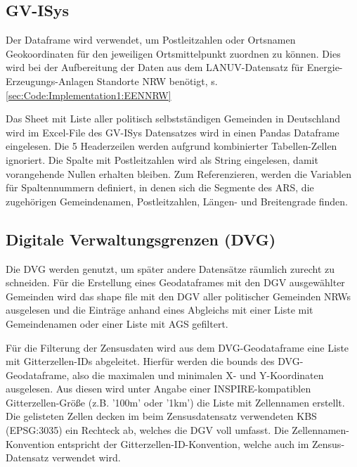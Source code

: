 		\subsection{GV-ISys}
		Der Dataframe wird verwendet, um Postleitzahlen oder Ortsnamen Geokoordinaten für den jeweiligen Ortsmittelpunkt zuordnen zu können. Dies wird bei der Aufbereitung der Daten aus dem LANUV-Datensatz für Energie-Erzeugungs-Anlagen Standorte NRW benötigt, s. \autoref{sec:Code:Implementation1:EENNRW}
		
		Das Sheet mit Liste aller politisch selbstständigen Gemeinden in Deutschland wird im Excel-File des GV-ISys Datensatzes wird in einen Pandas Dataframe eingelesen. Die 5 Headerzeilen werden aufgrund kombinierter Tabellen-Zellen ignoriert. Die Spalte mit Postleitzahlen wird als String eingelesen, damit vorangehende Nullen erhalten bleiben. Zum Referenzieren, werden die Variablen für Spaltennummern definiert, in denen sich die Segmente des ARS, die zugehörigen Gemeindenamen, Postleitzahlen, Längen- und Breitengrade finden.
		
		\subsection{Digitale Verwaltungsgrenzen (DVG)}
		\label{sec:Code:Implementation1:DVG}
			
			Die DVG werden genutzt, um später andere Datensätze räumlich zurecht zu schneiden. Für die Erstellung eines Geodataframes mit den DGV ausgewählter Gemeinden wird das shape file mit den DGV aller politischer Gemeinden NRWs ausgelesen und die Einträge anhand eines Abgleichs mit einer Liste mit Gemeindenamen oder einer Liste mit AGS gefiltert.
			
			Für die Filterung der Zensusdaten wird aus dem DVG-Geodataframe eine Liste mit Gitterzellen-IDs abgeleitet.
			Hierfür werden die bounds des DVG-Geodataframe, also die maximalen und minimalen X- und Y-Koordinaten ausgelesen. Aus diesen wird unter Angabe einer INSPIRE-kompatiblen Gitterzellen-Größe (z.B. '100m' oder '1km') die Liste mit Zellennamen erstellt. Die gelisteten Zellen decken im beim Zensusdatensatz verwendeten KBS (EPSG:3035) ein Rechteck ab, welches die DGV voll umfasst. Die Zellennamen-Konvention entspricht der Gitterzellen-ID-Konvention, welche auch im Zensus-Datensatz verwendet wird. 
			
